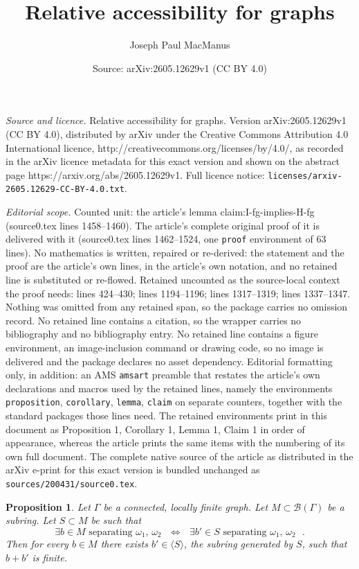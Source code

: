 \documentclass[10pt,a4paper]{amsart}
\title{Relative accessibility for graphs}
\author{Joseph Paul MacManus}
\date{Source: arXiv:2605.12629v1 (CC BY 4.0)}
\newtheorem{proposition}{Proposition}
\newcommand{\br}{{\mathscr{B}}}
\begin{document}
\maketitle

\noindent\emph{Source and licence.} Relative accessibility for graphs. Version arXiv:2605.12629v1 (CC BY 4.0), distributed by arXiv under the Creative Commons Attribution 4.0 International licence, http://creativecommons.org/licenses/by/4.0/, as recorded in the arXiv licence metadata for this exact version and shown on the abstract page https://arxiv.org/abs/2605.12629v1. Full licence notice: \texttt{licenses/arxiv-2605.12629-CC-BY-4.0.txt}.\par\smallskip

\noindent\textit{Editorial scope.} Counted unit: the article's lemma claim:I-fg-implies-H-fg (source0.tex lines 1458--1460). The article's complete original proof of it is delivered with it (source0.tex lines 1462--1524, one \texttt{proof} environment of 63 lines). No mathematics is written, repaired or re-derived: the statement and the proof are the article's own lines, in the article's own notation, and no retained line is substituted or re-flowed.  Retained uncounted as the source-local context the proof needs: lines 424--430; lines 1194--1196; lines 1317--1319; lines 1337--1347.  Nothing was omitted from any retained span, so the package carries no omission record.  No retained line contains a citation, so the wrapper carries no bibliography and no bibliography entry.  No retained line contains a figure environment, an image-inclusion command or drawing code, so no image is delivered and the package declares no asset dependency.  Editorial formatting only, in addition: an AMS \texttt{amsart} preamble that restates the article's own declarations and macros used by the retained lines, namely the environments \texttt{proposition}, \texttt{corollary}, \texttt{lemma}, \texttt{claim} on separate counters, together with the standard packages those lines need.  The retained environments print in this document as Proposition 1, Corollary 1, Lemma 1, Claim 1 in order of appearance, whereas the article prints the same items with the numbering of its own full document.  The complete native source of the article as distributed in the arXiv e-print for this exact version is bundled unchanged as \texttt{sources/200431/source0.tex}.
\begin{proposition}\label{prop:g-finite-criterion}
    Let $\Gamma$ be a connected, locally finite graph. Let $M \subset \br(\Gamma)$ be a subring. Let $S \subset M$ be such that
    $$
    \text{$\exists b \in M$ separating $\omega_1$, $\omega_2$ $\iff$ $\exists b' \in S$ separating $\omega_1$, $\omega_2$ }.
    $$
    Then for every $b \in M$ there exists $b' \in \langle S \rangle$, the subring generated by $S$, such that $b+b'$ is finite.
\end{proposition}
\end{document}
